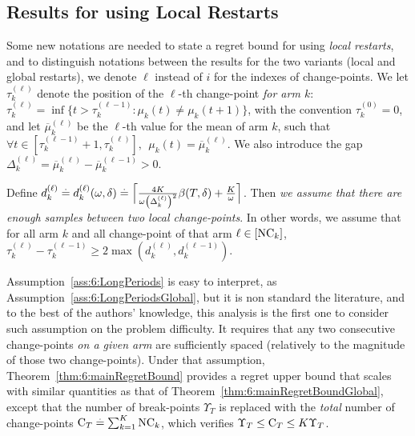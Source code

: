 \subsection{Results for \GLRklUCB{} using Local Restarts}

Some new notations are needed to state a regret bound for \GLRklUCB{} using \emph{local restarts},
and to distinguish notations between the results for the two variants (local and global restarts), we denote $\ell$ instead of $i$ for the indexes of change-points.
We let $\tau_k^{(\ell)}$ denote the position of the $\ell$-th change-point \emph{for arm $k$}: $\tau_k^{(\ell)} = \inf \{ t > \tau_k^{(\ell - 1)} : \mu_k(t) \neq \mu_k(t+1)\}$,
with the convention $\tau_k^{(0)}=0$, and let $\overline{\mu}_k^{(\ell)}$ be the $\ell$-th value for the mean of arm $k$, such that $\forall t \in [\tau_k^{(\ell-1)}+1, \tau_k^{(\ell)}], \ \ \mu_k(t) = \overline{\mu}_k^{(\ell)}$.
We also introduce the gap $\Delta_k^{(\ell)} = \overline{\mu}_k^{(\ell)} - \overline{\mu}_k^{(\ell-1)} > 0$.

\begin{assumption}\label{ass:6:LongPeriods}
\begin{leftbar}[assumptionbar]  %
    Define
    $d_k^{(\ell)} \overset{.}{=} d_k^{(\ell)}(\omega,\delta) \overset{.}{=} \Bigl\lceil \frac{4K}{\omega\left(\Delta_k^{(\ell)}\right)^2}\beta(T,\delta) + \frac{K}{\omega} \Bigr\rceil$.
    Then \emph{we assume that there are enough samples between two local change-points}.
    In other words, we assume that for all arm $k$ and all change-point of that arm $\ell \in [\text{NC}_k]$, $\tau_k^{(\ell)} - \tau_k^{(\ell-1)} \geq 2\max (d_k^{(\ell)},d_k^{(\ell-1)})$.
\end{leftbar}  %
\end{assumption}

Assumption~\ref{ass:6:LongPeriods} is easy to interpret, as Assumption~\ref{ass:6:LongPeriodsGlobal}, but it is non standard the literature, and to the best of the authors' knowledge, this analysis is the first one to consider such assumption on the problem difficulty.
%
It requires that any two consecutive change-points \emph{on a given arm} are sufficiently spaced (relatively to the magnitude of those two change-points). Under that assumption, Theorem~\ref{thm:6:mainRegretBound} provides a regret upper bound that scales with similar quantities as that of Theorem~\ref{thm:6:mainRegretBoundGlobal}, except that the number of break-points $\Upsilon_T$ is replaced with the \emph{total} number of change-points $\mathrm{C}_T \overset{.}{=} \sum_{k=1}^K \text{NC}_k$, which verifies $\Upsilon_T \leq \mathrm{C}_T \leq K \Upsilon_T$.

